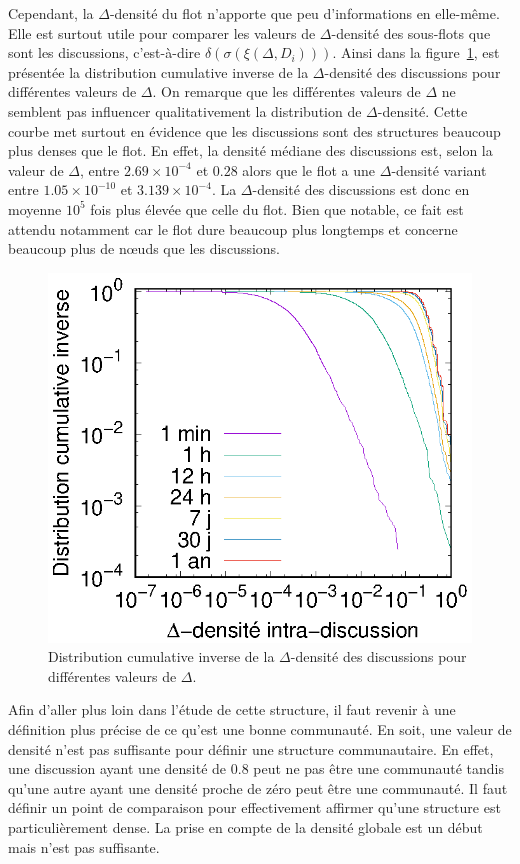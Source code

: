 Cependant, la $\Delta$-densité du flot n'apporte que peu d'informations en elle-même.
Elle est surtout utile pour comparer les valeurs de $\Delta$-densité des sous-flots que sont les discussions, c'est-à-dire $\delta(\sigma(\xi(\Delta,D_i)))$.
Ainsi dans la figure~\ref{fig:intra_dens_discussion}, est présentée la distribution cumulative inverse de la $\Delta$-densité des discussions pour différentes valeurs de $\Delta$.
On remarque que les différentes valeurs de $\Delta$ ne semblent pas influencer qualitativement la distribution de $\Delta$-densité.
Cette courbe met surtout en évidence que les discussions sont des structures beaucoup plus denses que le flot.
En effet, la densité médiane des discussions est, selon la valeur de $\Delta$, entre $2.69 \times 10^{-4}$ et $0.28$ alors que le flot a une $\Delta$-densité variant entre $1.05  \times 10^{-10}$ et $3.139 \times 10^{-4}$.
La $\Delta$-densité des discussions est donc en moyenne $10^{5}$ fois plus élevée que celle du flot.
Bien que notable, ce fait est attendu notamment car le flot dure beaucoup plus longtemps et concerne beaucoup plus de n\oe{}uds que les discussions.
\begin{figure}
\centering
	\includegraphics[width=0.4\linewidth]{img/mailing/delta.eps}

\caption{Distribution cumulative inverse de la $\Delta$-densité des discussions pour différentes valeurs de $\Delta$.}
\label{fig:intra_dens_discussion}
\end{figure}

Afin d'aller plus loin dans l'étude de cette structure, il faut revenir à une définition plus précise de ce qu'est une bonne communauté.
En soit, une valeur de densité n'est pas suffisante pour définir une structure communautaire.
En effet, une discussion ayant une densité de $0.8$ peut ne pas être une communauté tandis qu'une autre ayant une densité proche de zéro peut être une communauté.
Il faut définir un point de comparaison pour effectivement affirmer qu'une structure est particulièrement dense.
La prise en compte de la densité globale est un début mais n'est pas suffisante.

